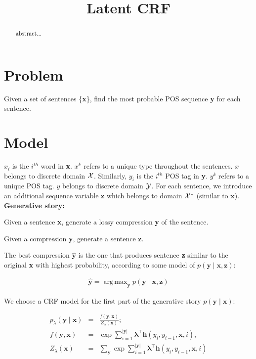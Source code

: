 \documentclass[11pt,onecolumn]{article}
\title{Latent CRF}
\date{}
\DeclareMathOperator*{\argmax}{arg\,max}
\newenvironment{itemizesquish}{\begin{list}{\labelitemi}{\setlength{\itemsep}{0em}\setlength{\labelwidth}{0.5em}\setlength{\leftmargin}{\labelwidth}\addtolength{\leftmargin}{\labelsep}}}{\end{list}}
\begin{document}
\maketitle
\begin{abstract}
abstract...
\end{abstract}

\section{Problem}

Given a set of sentences \{\textbf{x}\}, find the most probable POS sequence \textbf{y} for each sentence. 

\section{Model}

$x_i$ is the $i^{th}$ word in \textbf{x}. $x^k$ refers to a unique type throughout the sentences. $x$ belongs to discrete domain $\cal{X}$. 
Similarly, $y_i$ is the $i^{th}$ POS tag in \textbf{y}. $y^k$ refers to a unique POS tag. $y$ belongs to discrete domain $\cal{Y}$. 
For each sentence, we introduce an additional sequence variable \textbf{z} which belongs to domain $\cal{X}^*$ (similar to $\mathbf{x}$).\\


\textbf{Generative story:}
\begin{itemizesquish}
\item Given a sentence \textbf{x}, generate a lossy compression \textbf{y} of the sentence.
\item Given a compression \textbf{y}, generate a sentence \textbf{z}.
\end{itemizesquish}

The best compression $\hat{\mathbf{y}}$ is the one that produces sentence \textbf{z} similar to the original \textbf{x} with highest probability, according to some model of $p(\mathbf{y} \mid \mathbf{x}, \mathbf{z})$:

\begin{eqnarray}
\hat{\mathbf{y}} = \argmax_\mathbf{y} p(\mathbf{y} \mid \mathbf{x}, \mathbf{z}) 
\end{eqnarray}

We choose a CRF model for the first part of the generative story $p(\mathbf{y} \mid \mathbf{x})$:

\begin{eqnarray}
p_\lambda(\mathbf{y}\mid\mathbf{x}) &=& \frac{f(\mathbf{y}, \mathbf{x})}{Z_\lambda(\mathbf{x})}; \\
f(\mathbf{y}, \mathbf{x}) &=& \exp \sum_{i=1}^{|\mathbf{y}|} \boldsymbol{\lambda}^\top \mathbf{h}(y_i, y_{i-1}, \mathbf{x}, i), \\
Z_\lambda(\mathbf{x}) &=& \sum_\mathbf{y} \exp \sum_{i=1}^{|\mathbf{y}|} \boldsymbol{\lambda}^\top \mathbf{h}(y_i, y_{i-1}, \mathbf{x}, i)
\end{eqnarray}
\end{document}
